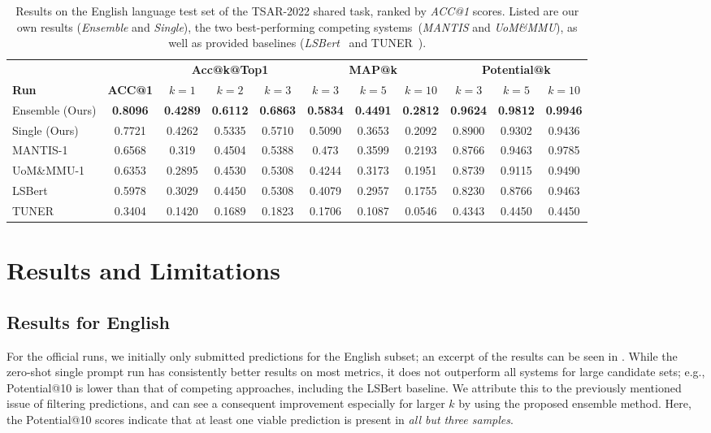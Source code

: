 \documentclass[11pt]{article}
\begin{document}
\begin{table*}
	\hspace*{-0.25cm}
	\setlength{\tabcolsep}{3pt}
\centering
\begin{tabular}{l|c|ccc|ccc|ccc}
 	&       & \multicolumn{3}{c|}{\textbf{Acc@k@Top1}} & \multicolumn{3}{c|}{\textbf{MAP@k}} & \multicolumn{3}{c}{\textbf{Potential@k}}\\
\textbf{Run} & \textbf{ACC@1} & $k=1$ & $k=2$ & $k=3$ & $k=3$ & $k=5$ & $k=10$ & $k=3$ & $k=5$ & $k=10$\\
\hline
Ensemble (Ours) & \textbf{0.8096} & \textbf{0.4289} & \textbf{0.6112} & \textbf{0.6863} & \textbf{0.5834} & \textbf{0.4491} & \textbf{0.2812} & \textbf{0.9624} & \textbf{0.9812} & \textbf{0.9946}\\
Single (Ours) & 0.7721 & 0.4262 & 0.5335 & 0.5710 & 0.5090 & 0.3653 & 0.2092 & 0.8900 & 0.9302 & 0.9436\\
\hline
MANTIS-1 & 0.6568 & 0.319 & 0.4504 & 0.5388 & 0.473 & 0.3599 & 0.2193 & 0.8766 & 0.9463 & 0.9785\\
UoM\&MMU-1 & 0.6353 & 0.2895 & 0.4530 & 0.5308 & 0.4244 & 0.3173 & 0.1951 & 0.8739 & 0.9115 & 0.9490\\
LSBert & 0.5978 & 0.3029 & 0.4450 & 0.5308 & 0.4079 & 0.2957 & 0.1755 & 0.8230 & 0.8766 & 0.9463 \\
TUNER & 0.3404 & 0.1420 & 0.1689 & 0.1823 & 0.1706 & 0.1087 & 0.0546 & 0.4343 & 0.4450 & 0.4450 \\
\end{tabular}
\caption{Results on the English language test set of the TSAR-2022 shared task, ranked by \emph{ACC@1} scores. Listed are our own results (\emph{Ensemble} and  \emph{Single}), the two best-performing competing systems~(\emph{MANTIS} and \emph{UoM\&MMU}), as well as provided baselines (\emph{LSBert}~\cite{qiang-etal-2020-lexical} and TUNER~\cite{ferres-etal-2017-adaptable}).}
\label{tab:english}
\end{table*}


\section{Results and Limitations}

\subsection{Results for English}
For the official runs, we initially only submitted predictions for the English subset; an excerpt of the results can be seen in .
While the zero-shot single prompt run has consistently better results on most metrics, it does not outperform all systems for large candidate sets; e.g., Potential@10 is lower than that of competing approaches, including the LSBert baseline.
We attribute this to the previously mentioned issue of filtering predictions, and can see a consequent improvement especially for larger $k$ by using the proposed ensemble method. Here, the Potential@10 scores indicate that at least one viable prediction is present in \emph{all but three samples}.
\end{document}
